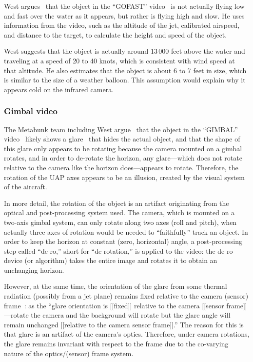 West argues~\cite{West2022Nov,West2019Jun} that the object in the ``GOFAST'' video~\cite{NAVAIRFOIAGOFAST2020Apr}
is not actually flying low and fast over the water as it appears, but rather is flying high and slow.
He uses information from the video, such as the altitude of the jet, calibrated airspeed,
and distance to the target, to calculate the height and speed of the object.

West suggests that the object is actually around 13\,000 feet above the water and traveling at a speed of 20 to 40 knots,
which is consistent with wind speed at that altitude. He also estimates that the object is about 6 to 7 feet in size,
which is similar to the size of a weather balloon.
This assumption would explain why it appears cold on the infrared camera.

\subsubsection*{Gimbal video}

The Metabunk team including West argue~\cite{markus2022Sep,West2022Nov,West2022Mar,WestFravorWest2020Sep} that the object in the ``GIMBAL'' video~\cite{NAVAIRFOIAGIMBAL2020Apr}
likely shows a glare~\cite{Talvala_2007} that hides the actual object, and that the shape of this glare only appears to be rotating because
the camera mounted on a gimbal rotates, and in order to de-rotate the horizon, any glare---which does not rotate relative to the camera like the horizon does---appears to rotate.
Therefore, the rotation of the UAP axes appears to be an illusion, created by the visual system of the aircraft.

In more detail, the rotation of the object is an artifact originating from the optical and post-processing system used.
The camera, which is mounted on a two-axis gimbal system, can only rotate along two axes (roll and pitch), when actually three axes of rotation would
be needed to ``faithfully'' track an object.
In order to keep the horizon at constant (zero, horizontal) angle, a post-processing step called ``de-ro,'' short for ``de-rotation,'' is applied to the video:
the de-ro device (or algorithm) takes the entire image and rotates it to obtain an unchanging horizon.

However, at the same time, the orientation of the glare from some thermal radiation (possibly from a jet plane) remains fixed relative to the camera (sensor) frame~\cite[time = 632~s]{West2022Mar}:
as the ``glare orientation is [[fixed]] relative to the camera [[sensor frame]]---rotate the camera and
the background will rotate but the glare angle will remain unchanged [[relative to the camera sensor frame]].''
The reason for this is that glare is an artifact of the camera's optics.  Therefore, under camera rotations, the glare remains
invariant with respect to the frame due to the co-varying nature of the optics/(sensor) frame system.


